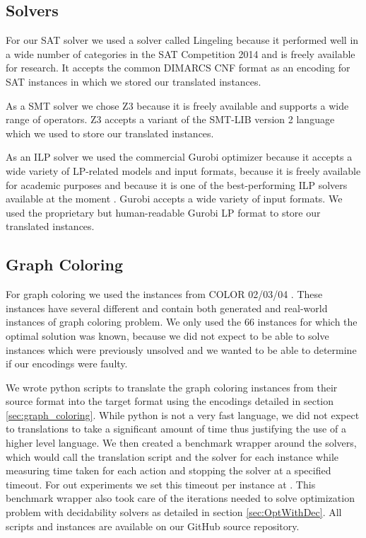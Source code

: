 \documentclass{sig-alternate}
\begin{document}
\subsection{Solvers}

For our SAT solver we used a solver called Lingeling \cite{solverLingeling} because it performed well in a wide number of categories in the SAT Competition 2014 \cite{comp2014sat} and is freely available for research.
It accepts the common DIMARCS CNF format \cite{challenge1993satisfiability} as an encoding for SAT instances in which we stored our translated instances.

As a SMT solver we chose Z3 \cite{de2008z3} because it is freely available and supports a wide range of operators.
Z3 accepts a variant of the SMT-LIB version 2 \cite{barrett2010smt} language which we used to store our translated instances.

As an ILP solver we used the commercial Gurobi optimizer \cite{gurobi} because it accepts a wide variety of LP-related models and input formats, because it is freely available for academic purposes and because it is one of the best-performing ILP solvers available at the moment \cite{meindl2012analysis}.
Gurobi accepts a wide variety of input formats.
We used the proprietary but human-readable Gurobi LP format to store our translated instances.

\subsection{Graph Coloring}

For graph coloring we used the instances from COLOR 02/03/04 \cite{color04}.
These instances have several different and contain both generated and real-world instances of graph coloring problem.
We only used the 66 instances for which the optimal solution was known, because we did not expect to be able to solve instances which were previously unsolved and we wanted to be able to determine if our encodings were faulty.

We wrote python scripts to translate the graph coloring instances from their source format into the target format using the encodings detailed in section \ref{sec:graph_coloring}.
While python is not a very fast language, we did not expect to translations to take a significant amount of time thus justifying the use of a higher level language.
We then created a benchmark wrapper around the solvers, which would call the translation script and the solver for each instance while measuring time taken for each action and stopping the solver at a specified timeout.
For out experiments we set this timeout per instance at .
This benchmark wrapper also took care of the iterations needed to solve optimization problem with decidability solvers as detailed in section \ref{sec:OptWithDec}. All scripts and instances are available on our GitHub source repository.
\end{document}
